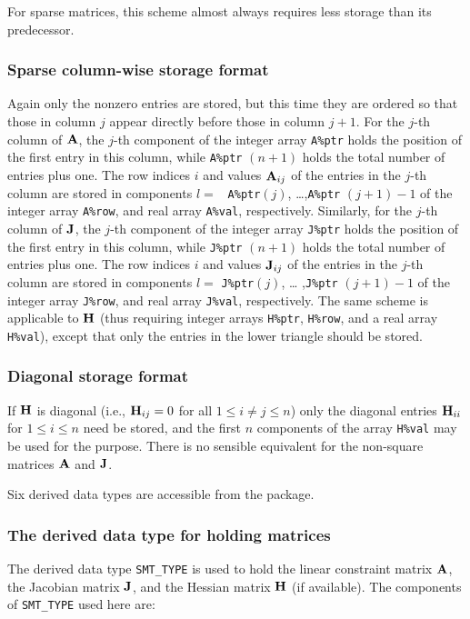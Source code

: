 \documentclass{galahad}
\begin{document}
For sparse matrices, this scheme almost always requires less storage than 
its predecessor.

\subsubsection{Sparse column-wise storage format}\label{columnwise}
Again only the nonzero entries are stored, but this time they are
ordered so that those in column $j$ appear directly before those in
column $j+1$. For the $j$-th column of ${\mathbf{A}}$, the $j$-th component of
the integer array {\tt A\%ptr} holds the position of the first entry in
this column, while {\tt A\%ptr} $(n+1)$ holds the total number of
entries plus one.  The row indices $i$ and values ${\mathbf{A}}_{ij}$ of the
entries in the $j$-th column are stored in components $l =$ {\tt
  A\%ptr}$(j)$, \ldots ,{\tt A\%ptr} $(j+1)-1$ of the integer array
{\tt A\%row}, and real array {\tt A\%val}, respectively.  Similarly,
for the $j$-th column of ${\mathbf{J}}$, the $j$-th component of the integer array
{\tt J\%ptr} holds the position of the first entry in this column,
while {\tt J\%ptr} $(n+1)$ holds the total number of entries plus one.
The row indices $i$ and values ${\mathbf{J}}_{ij}$ of the entries in the
$j$-th column are stored in components $l =$ {\tt J\%ptr}$(j)$, \ldots
,{\tt J\%ptr} $(j+1)-1$ of the integer array {\tt J\%row}, and real
array {\tt J\%val}, respectively.  The same scheme is applicable to
${\mathbf{H}}$ (thus requiring integer arrays {\tt H\%ptr}, {\tt H\%row}, and
a real array {\tt H\%val}), except that only the entries in the lower
triangle should be stored.

\subsubsection{Diagonal storage format}\label{diagonal}
If ${\mathbf{H}}$ is diagonal (i.e., ${\mathbf{H}}_{ij} = 0$ for all $1 \leq i \neq j \leq n$)
only the diagonal entries ${\mathbf{H}}_{ii}$ for $1 \leq i \leq n$ need be stored,
and the first $n$ components of the array {\tt H\%val} may be used for 
the purpose. There is no sensible equivalent for the non-square
matrices ${\mathbf{A}}$ and ${\mathbf{J}}$.


\galtypes
Six derived data types are accessible from the package.


\subsubsection{The derived data type for holding matrices}\label{typesmt}
The derived data type {\tt SMT\_TYPE} is used to hold the linear
constraint matrix ${\mathbf{A}}$, the Jacobian matrix ${\mathbf{J}}$, and the Hessian
matrix ${\mathbf{H}}$ (if available). The components of {\tt SMT\_TYPE}
used here are:
\end{document}
